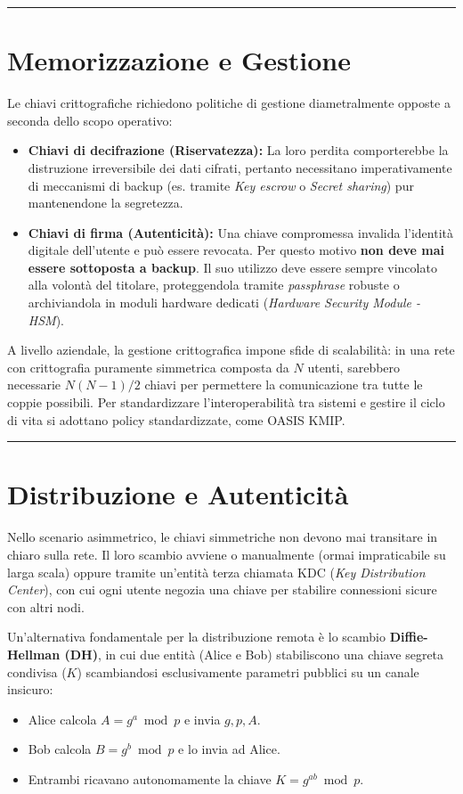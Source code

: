 \documentclass[12pt, a4paper]{report}
\begin{document}
\noindent\rule{\textwidth}{0.4pt}

\section{Memorizzazione e Gestione}
Le chiavi crittografiche richiedono politiche di gestione diametralmente opposte a seconda dello scopo operativo:
\begin{itemize}
	\item \textbf{Chiavi di decifrazione (Riservatezza):} La loro perdita comporterebbe la distruzione irreversibile dei dati cifrati, pertanto necessitano imperativamente di meccanismi di backup (es. tramite \textit{Key escrow} o \textit{Secret sharing}) pur mantenendone la segretezza.
	\item \textbf{Chiavi di firma (Autenticità):} Una chiave compromessa invalida l'identità digitale dell'utente e può essere revocata. Per questo motivo \textbf{non deve mai essere sottoposta a backup}. Il suo utilizzo deve essere sempre vincolato alla volontà del titolare, proteggendola tramite \textit{passphrase} robuste o archiviandola in moduli hardware dedicati (\textit{Hardware Security Module - HSM}).
\end{itemize}

A livello aziendale, la gestione crittografica impone sfide di scalabilità: in una rete con crittografia puramente simmetrica composta da $N$ utenti, sarebbero necessarie $N(N-1)/2$ chiavi per permettere la comunicazione tra tutte le coppie possibili. Per standardizzare l'interoperabilità tra sistemi e gestire il ciclo di vita si adottano policy standardizzate, come OASIS KMIP.

\noindent\rule{\textwidth}{0.4pt}

\section{Distribuzione e Autenticità}
Nello scenario asimmetrico, le chiavi simmetriche non devono mai transitare in chiaro sulla rete. Il loro scambio avviene o manualmente (ormai impraticabile su larga scala) oppure tramite un'entità terza chiamata KDC (\textit{Key Distribution Center}), con cui ogni utente negozia una chiave per stabilire connessioni sicure con altri nodi.

Un'alternativa fondamentale per la distribuzione remota è lo scambio \textbf{Diffie-Hellman (DH)}, in cui due entità (Alice e Bob) stabiliscono una chiave segreta condivisa ($K$) scambiandosi esclusivamente parametri pubblici su un canale insicuro:
\begin{itemize}
	\item Alice calcola $A=g^{a} \bmod p$ e invia $g, p, A$.
	\item Bob calcola $B=g^{b} \bmod p$ e lo invia ad Alice.
	\item Entrambi ricavano autonomamente la chiave $K = g^{ab} \bmod p$.
\end{itemize}
\end{document}
